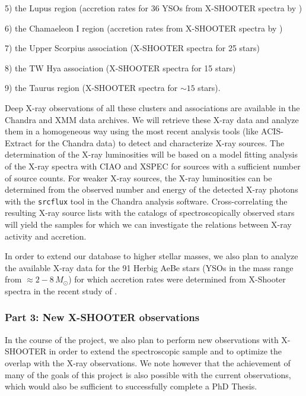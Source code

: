 \documentclass[10pt,fleqn,twoside]{article}
\begin{document}
5) the Lupus region (accretion rates for 36 YSOs from X-SHOOTER spectra by \citet{Alcala14})
\smallskip


6) the Chamaeleon I region (accretion rates from X-SHOOTER spectra by \citet{Manara16})
\smallskip

7) the Upper Scorpius association (X-SHOOTER spectra  for 25 stars)
\smallskip

8) the TW Hya association (X-SHOOTER spectra  for 15 stars)
\smallskip

9) the Taurus region (X-SHOOTER spectra  for $\sim 15$ stars).
\medskip



%
Deep X-ray observations of all these clusters and associations are available in the Chandra and XMM data
archives.  We will retrieve these X-ray data and analyze them in a homogeneous way
using the most recent analysis tools (like ACIS-Extract for the Chandra data) to detect
and characterize X-ray sources. The determination of the X-ray luminosities will be
based on a model fitting analysis of the X-ray spectra with CIAO and XSPEC for sources
with a sufficient number of source counts. For weaker X-ray sources, 
the  X-ray luminosities can be determined from the observed number and energy of the 
detected X-ray photons with the {\tt srcflux} tool in the Chandra analysis software.
Cross-correlating the resulting X-ray source lists with the catalogs of spectroscopically
observed stars will yield the samples for which we can investigate the relations between
X-ray activity and accretion.
\smallskip


In order to extend our database to higher stellar masses, we also plan to analyze 
the available X-ray data for the 91 Herbig AeBe stars (YSOs in the mass range from 
$\approx 2 - 8\,M_\odot$) for which 
accretion rates were determined from X-Shooter spectra in 
the recent study of \citet{Fairlamb16}.


\subsubsection*{Part 3:  New X-SHOOTER observations}

In the course of the project, we also plan to perform new
observations with X-SHOOTER in order to extend the
spectroscopic sample and to optimize the overlap with the X-ray
observations. We note however that the achievement of many of the goals of this
project is also possible with the current observations, which would
also be sufficient to successfully complete a PhD Thesis. 
\end{document}
